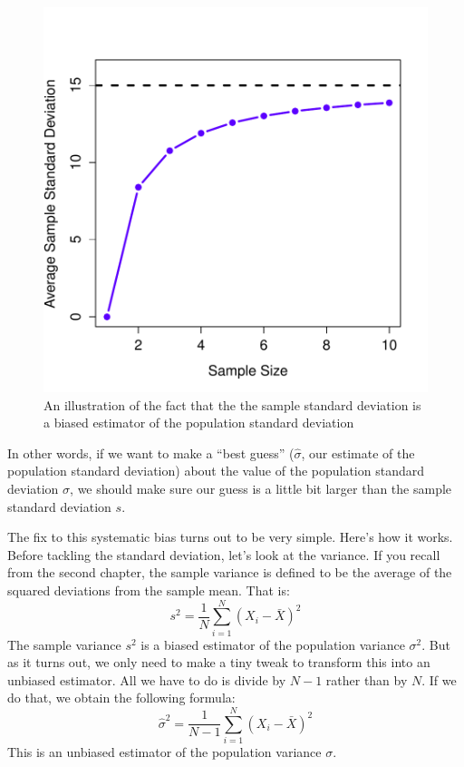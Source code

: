 \documentclass[]{book}
\begin{document}
\begin{figure}
\centering
\includegraphics{navarro_img/estimation/biasSD-eps-converted-to.pdf}
\caption{\label{fig:estimatorbiasB}An illustration of the fact that the the sample standard deviation is a biased estimator of the population standard deviation}
\end{figure}

In other words, if we want to make a ``best guess'' (\(\hat\sigma\), our estimate of the population standard deviation) about the value of the population standard deviation \(\sigma\), we should make sure our guess is a little bit larger than the sample standard deviation \(s\).

The fix to this systematic bias turns out to be very simple. Here's how it works. Before tackling the standard deviation, let's look at the variance. If you recall from the second chapter, the sample variance is defined to be the average of the squared deviations from the sample mean. That is: \[s^2 = \frac{1}{N} \sum_{i=1}^N (X_i - \bar{X})^2\] The sample variance \(s^2\) is a biased estimator of the population variance \(\sigma^2\). But as it turns out, we only need to make a tiny tweak to transform this into an unbiased estimator. All we have to do is divide by \(N-1\) rather than by \(N\). If we do that, we obtain the following formula: \[\hat\sigma^2 = \frac{1}{N-1} \sum_{i=1}^N (X_i - \bar{X})^2\] This is an unbiased estimator of the population variance \(\sigma\).
\end{document}
